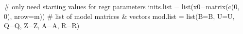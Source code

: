 \begin{Schunk}
\begin{Sinput}
 # only need starting values for regr parameters
 inits.list = list(x0=matrix(c(0, 0), nrow=m))
 # list of model matrices & vectors
 mod.list = list(B=B, U=U, Q=Q, Z=Z, A=A, R=R)
\end{Sinput}
\end{Schunk}
